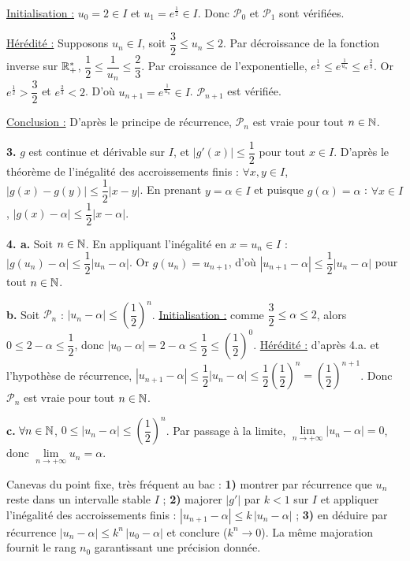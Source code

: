 \documentclass[11pt]{article}
\begin{document}
\underline{Initialisation :} $u_0 = 2 \in I$ et $u_1 = e^{\frac{1}{2}} \in I$. Donc $\mathcal{P}_0$ et $\mathcal{P}_1$ sont vérifiées.

\underline{Hérédité :} Supposons $u_n \in I$, soit $\dfrac{3}{2} \le u_n \le 2$. Par décroissance de la fonction inverse sur $\mathbb{R}_+^*$, $\dfrac{1}{2} \le \dfrac{1}{u_n} \le \dfrac{2}{3}$. Par croissance de l'exponentielle, $e^{\frac{1}{2}} \le e^{\frac{1}{u_n}} \le e^{\frac{2}{3}}$. Or $e^{\frac{1}{2}} > \dfrac{3}{2}$ et $e^{\frac{2}{3}} < 2$. D'où $u_{n+1} = e^{\frac{1}{u_n}} \in I$. $\mathcal{P}_{n+1}$ est vérifiée.

\underline{Conclusion :} D'après le principe de récurrence, $\mathcal{P}_n$ est vraie pour tout $n \in \mathbb{N}$.

\textbf{3.} $g$ est continue et dérivable sur $I$, et $|g'(x)| \le \dfrac{1}{2}$ pour tout $x \in I$. D'après le théorème de l'inégalité des accroissements finis : $\forall x, y \in I$, $|g(x) - g(y)| \le \dfrac{1}{2}|x - y|$. En prenant $y = \alpha \in I$ et puisque $g(\alpha) = \alpha$ : $\forall x \in I$, $|g(x) - \alpha| \le \dfrac{1}{2}|x - \alpha|$.

\textbf{4. a.} Soit $n \in \mathbb{N}$. En appliquant l'inégalité en $x = u_n \in I$ : $|g(u_n) - \alpha| \le \dfrac{1}{2}|u_n - \alpha|$. Or $g(u_n) = u_{n+1}$, d'où $|u_{n+1} - \alpha| \le \dfrac{1}{2}|u_n - \alpha|$ pour tout $n \in \mathbb{N}$.

\textbf{b.} Soit $\mathcal{P}_n$ : $|u_n - \alpha| \le \left(\dfrac{1}{2}\right)^n$. \underline{Initialisation :} comme $\dfrac{3}{2} \le \alpha \le 2$, alors $0 \le 2 - \alpha \le \dfrac{1}{2}$, donc $|u_0 - \alpha| = 2 - \alpha \le \dfrac{1}{2} \le \left(\dfrac{1}{2}\right)^0$. \underline{Hérédité :} d'après 4.a. et l'hypothèse de récurrence, $|u_{n+1} - \alpha| \le \dfrac{1}{2}|u_n - \alpha| \le \dfrac{1}{2}\left(\dfrac{1}{2}\right)^n = \left(\dfrac{1}{2}\right)^{n+1}$. Donc $\mathcal{P}_n$ est vraie pour tout $n \in \mathbb{N}$.

\textbf{c.} $\forall n \in \mathbb{N}$, $0 \le |u_n - \alpha| \le \left(\dfrac{1}{2}\right)^n$. Par passage à la limite, $\lim\limits_{n\to+\infty}|u_n - \alpha| = 0$, donc $\lim\limits_{n\to+\infty} u_n = \alpha$.

\begin{methode}
Canevas du point fixe, très fréquent au bac : \textbf{1)} montrer par
récurrence que $u_n$ reste dans un intervalle stable $I$ ;
\textbf{2)} majorer $|g'|$ par $k < 1$ sur $I$ et appliquer l'inégalité
des accroissements finis : $|u_{n+1} - \alpha| \le k\,|u_n - \alpha|$ ;
\textbf{3)} en déduire par récurrence $|u_n - \alpha| \le k^n\,|u_0 - \alpha|$
et conclure ($k^n \to 0$). La même majoration fournit le rang $n_0$
garantissant une précision donnée.
\end{methode}
\end{document}
